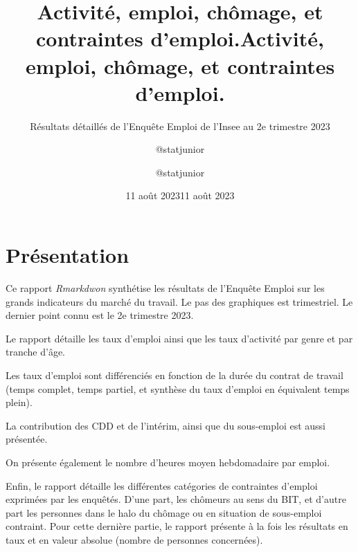 \documentclass[
  paper=a4,
  ,captions=tableheading
]{scrartcl}
\title{Activité, emploi, chômage, et contraintes d'emploi.}
\subtitle{Résultats détaillés de l'Enquête Emploi de l'Insee au 2e
trimestre 2023}
\author{@statjunior}
\date{11 août 2023}
\title{Activité, emploi, chômage, et contraintes d'emploi.}
\author{@statjunior}
\date{11 août 2023}
\begin{document}
\begin{titlepage}
\afterpage{\restorepagecolor}
\newcommand{\colorRule}[3][black]{\textcolor[HTML]{#1}{\rule{#2}{#3}}}
\end{titlepage}
\restoregeometry
{} 




\hypertarget{pruxe9sentation}{%
\section{Présentation}\label{pruxe9sentation}}

Ce rapport \emph{Rmarkdwon} synthétise les résultats de l'Enquête Emploi
sur les grands indicateurs du marché du travail. Le pas des graphiques
est trimestriel. Le dernier point connu est le 2e trimestre 2023.

Le rapport détaille les taux d'emploi ainsi que les taux d'activité par
genre et par tranche d'âge.

Les taux d'emploi sont différenciés en fonction de la durée du contrat
de travail (temps complet, temps partiel, et synthèse du taux d'emploi
en équivalent temps plein).

La contribution des CDD et de l'intérim, ainsi que du sous-emploi est
aussi présentée.

On présente également le nombre d'heures moyen hebdomadaire par emploi.

Enfin, le rapport détaille les différentes catégories de contraintes
d'emploi exprimées par les enquêtés. D'une part, les chômeurs au sens du
BIT, et d'autre part les personnes dans le halo du chômage ou en
situation de sous-emploi contraint. Pour cette dernière partie, le
rapport présente à la fois les résultats en taux et en valeur absolue
(nombre de personnes concernées).
\end{document}
